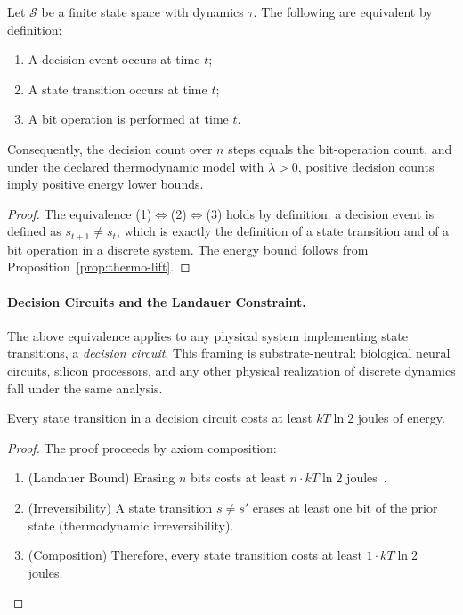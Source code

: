 \begin{proposition}\label{prop:decision-equivalence}
Let $\mathcal{S}$ be a finite state space with dynamics $\tau$. The following are equivalent by definition:
\begin{enumerate}
  \item A decision event occurs at time $t$;
  \item A state transition occurs at time $t$;
  \item A bit operation is performed at time $t$.
\end{enumerate}
Consequently, the decision count over $n$ steps equals the bit-operation count, and under the declared thermodynamic model with $\lambda > 0$, positive decision counts imply positive energy lower bounds.
\end{proposition}

\begin{proof}
The equivalence (1)$\Leftrightarrow$(2)$\Leftrightarrow$(3) holds by definition: a decision event is defined as $s_{t+1} \neq s_t$, which is exactly the definition of a state transition and of a bit operation in a discrete system. The energy bound follows from Proposition~\ref{prop:thermo-lift}.
\end{proof}

\paragraph{Decision Circuits and the Landauer Constraint.}
The above equivalence applies to any physical system implementing state transitions, a \emph{decision circuit}. This framing is substrate-neutral: biological neural circuits, silicon processors, and any other physical realization of discrete dynamics fall under the same analysis.

\begin{theorem}\label{thm:cycle-cost}
Every state transition in a decision circuit costs at least $kT\ln 2$ joules of energy.
\end{theorem}

\begin{proof}
The proof proceeds by axiom composition:
\begin{enumerate}
  \item (Landauer Bound) Erasing $n$ bits costs at least $n \cdot kT\ln 2$ joules~\cite{landauer1961irreversibility,bennett2003notes,berut2012experimental}.
  \item (Irreversibility) A state transition $s \neq s'$ erases at least one bit of the prior state (thermodynamic irreversibility).
  \item (Composition) Therefore, every state transition costs at least $1 \cdot kT\ln 2$ joules.
\end{enumerate}
\end{proof}

